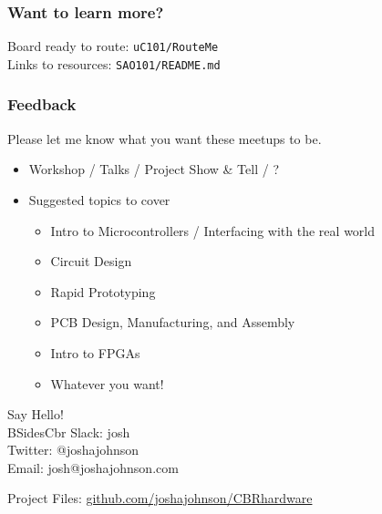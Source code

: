 \documentclass[t]{beamer}
\begin{document}
\begin{frame}
\frametitle{Want to learn more?}
Board ready to route: \texttt{uC101/RouteMe}\\
Links to resources: \texttt{SAO101/README.md}

\end{frame}


\begin{frame}
\frametitle{Feedback}
Please let me know what you want these meetups to be. \\
\begin{itemize}
\item Workshop / Talks / Project Show \& Tell / ?
\item Suggested topics to cover
\begin{itemize}
	\item Intro to Microcontrollers / Interfacing with the real world
	\item Circuit Design
	\item Rapid Prototyping
	\item PCB Design, Manufacturing, and Assembly
	\item Intro to FPGAs
	\item Whatever you want!
\end{itemize}
\end{itemize}
\vspace{5mm}
Say Hello! \\
BSidesCbr Slack: josh\\
Twitter: @\textunderscore joshajohnson\\
Email: josh@joshajohnson.com\\
\vspace{4mm}

Project Files: \url{github.com/joshajohnson/CBRhardware}\\
\end{frame}
\end{document}
